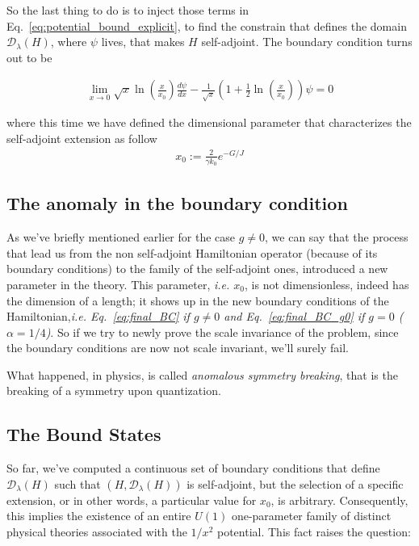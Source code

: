 \noindent
So the last thing to do is to inject those terms in Eq.~\eqref{eq:potential_bound_explicit}, to find the constrain that defines the domain $\mathcal{D}_\lambda(H)$, where $\psi$ lives, that makes $H$ self-adjoint. The boundary condition turns out to be

\begin{align}
    \lim_{x \to 0} \sqrt{x} \ln\left(\frac{x}{x_0}\right) \frac{d\psi}{dx} - \frac{1}{\sqrt{x}}\left(1+\frac{1}{2} \ln\left(\frac{x}{x_0}\right) \right) \psi =0
    \label{eq:final_BC_g0}
\end{align}

where this time we have defined the dimensional parameter that characterizes the self-adjoint extension as follow
\begin{align*}
    x_0 := \frac{2}{\gamma k_0} e^{-G/J}
\end{align*}

\subsection*{The anomaly in the boundary condition}

As we've briefly mentioned earlier for the case $g \neq 0$, we can say that the process that lead us from the non self-adjoint Hamiltonian operator (because of its boundary conditions) to the family of the self-adjoint ones, introduced a new parameter in the theory.
This parameter, \textit{i.e. $x_0$}, is not dimensionless, indeed has the dimension of a length; it shows up in the new boundary conditions of the Hamiltonian,\textit{i.e. Eq.~\eqref{eq:final_BC} if $g\neq 0$ and Eq.~\eqref{eq:final_BC_g0} if $g=0$ ($\alpha=1/4$)}. So if we try to newly prove the scale invariance of the problem, since the boundary conditions are now not scale invariant, we'll surely fail.

\vspace{4mm}
\noindent
What happened, in physics, is called \textit{anomalous symmetry breaking}, that is the breaking of a symmetry upon quantization.
  
\clearpage

\subsection{The Bound States}

So far, we've computed a continuous set of boundary conditions that define $\mathcal{D}_\lambda(H)$ such that $(H,\mathcal{D}_\lambda(H))$ is self-adjoint, but the selection of a specific extension, or in other words, a particular value for $x_0$, is arbitrary. Consequently, this implies the existence of an entire $U(1)$ one-parameter family of distinct physical theories associated with the $1/x^2$ potential.
This fact raises the question: 

